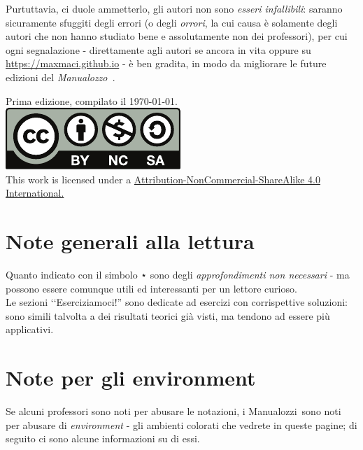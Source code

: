 Purtuttavia, ci duole ammetterlo, gli autori non sono \textit{esseri infallibili}: saranno sicuramente sfuggiti degli errori (o degli \textit{orrori}, la cui causa è solamente degli autori che non hanno studiato bene e assolutamente non dei professori), per cui ogni segnalazione - direttamente agli autori se ancora in vita oppure su \textcolor{redill}{\url{https://maxmaci.github.io}} - è ben gradita, in modo da migliorare le future edizioni del \textit{Manualozzo\texttrademark\ }.
\newpage
\thispagestyle{empty}
~\vfill
\begin{center}
	Prima edizione, compilato il \today.\\
			\includegraphics[trim=0cm 0cm 0cm 0cm,clip,scale=0.5]{images/Cc-by-nc-sa_icon.pdf}\\
	{\footnotesize This work is licensed under a \href{https://creativecommons.org/licenses/by-sa/4.0/}{Attribution-NonCommercial-ShareAlike 4.0 International.}}
\end{center}
\newpage
\section*{Note generali alla lettura}
Quanto indicato con il simbolo ⋆ sono degli \textit{approfondimenti non necessari} - ma possono essere comunque utili ed interessanti per un lettore curioso.\\
Le sezioni ‘‘Eserciziamoci!'' sono dedicate ad esercizi con corrispettive soluzioni: sono simili talvolta a dei risultati teorici già visti, ma tendono ad essere più applicativi.
\section*{Note per gli environment}
Se alcuni professori sono noti per abusare le notazioni, i Manualozzi\texttrademark\ sono noti per abusare di \textit{environment} - gli ambienti colorati che vedrete in queste pagine; di seguito ci sono alcune informazioni su di essi.


